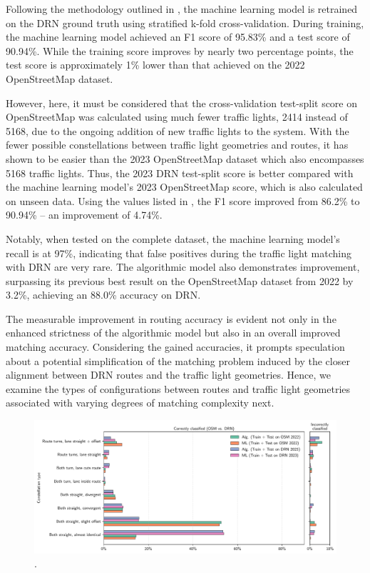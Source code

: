 Following the methodology outlined in , the machine learning model is retrained on the DRN ground truth using stratified k-fold cross-validation. During training, the machine learning model achieved an F1 score of 95.83\% and a test score of 90.94\%. While the training score improves by nearly two percentage points, the test score is approximately 1\% lower than that achieved on the 2022 OpenStreetMap dataset. 

However, here, it must be considered that the cross-validation test-split score on OpenStreetMap was calculated using much fewer traffic lights, 2414 instead of 5168, due to the ongoing addition of new traffic lights to the system. With the fewer possible constellations between traffic light geometries and routes, it has shown to be easier than the 2023 OpenStreetMap dataset which also encompasses 5168 traffic lights. Thus, the 2023 DRN test-split score is better compared with the machine learning model's 2023 OpenStreetMap score, which is also calculated on unseen data. Using the values listed in , the F1 score improved from 86.2\% to 90.94\% -- an improvement of 4.74\%. 

Notably, when tested on the complete dataset, the machine learning model's recall is at 97\%, indicating that false positives during the traffic light matching with DRN are very rare. The algorithmic model also demonstrates improvement, surpassing its previous best result on the OpenStreetMap dataset from 2022 by 3.2\%, achieving an 88.0\% accuracy on DRN. 

The measurable improvement in routing accuracy is evident not only in the enhanced strictness of the algorithmic model but also in an overall improved matching accuracy. Considering the gained accuracies, it prompts speculation about a potential simplification of the matching problem induced by the closer alignment between DRN routes and the traffic light geometries. Hence, we examine the types of configurations between routes and traffic light geometries associated with varying degrees of matching complexity next.

\begin{figure}[t]
\centering 
\includegraphics[width=\linewidth]{images/matching-constellations-osm-vs-drn.pdf}
\caption{.}
\label{fig:matching-constellations-osm-vs-drn}
\end{figure}


